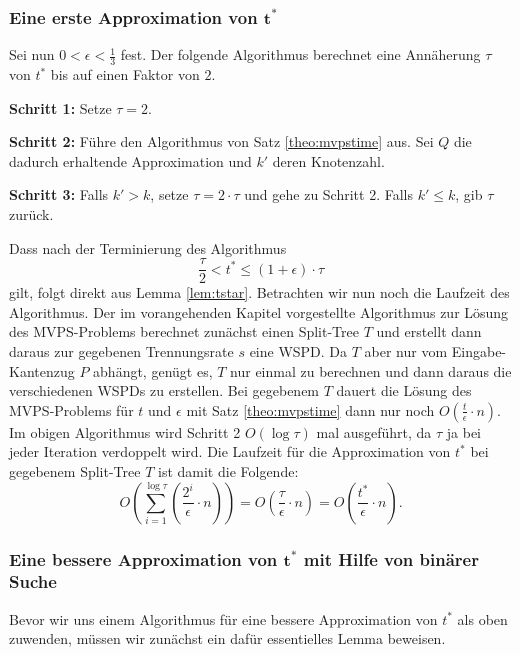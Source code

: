 \subsubsection*{Eine erste Approximation von $\mathbf{t^*}$}

Sei nun $0 < \epsilon < \frac{1}{3}$ fest.
Der folgende Algorithmus berechnet eine Annäherung $\tau$ von $t^*$ bis auf einen Faktor von $2$.
\begin{description}
	\item{\textbf{Schritt 1:}} Setze $\tau = 2$.
	\item{\textbf{Schritt 2:}} Führe den Algorithmus von Satz \ref{theo:mvpstime} aus. Sei $Q$ die dadurch erhaltende Approximation und $k'$ deren Knotenzahl.
	\item{\textbf{Schritt 3:}} Falls $k' > k$, setze $\tau = 2 \cdot \tau$ und gehe zu Schritt 2.
	Falls $k' \leq k$, gib $\tau$ zurück.
\end{description}

Dass nach der Terminierung des Algorithmus 
\[
	\label{eq:tau}
	\frac{\tau}{2} < t^* \leq (1 + \epsilon) \cdot \tau \tag{$\ast$}
\]
gilt, folgt direkt aus Lemma \ref{lem:tstar}. 
Betrachten wir nun noch die Laufzeit des Algorithmus. 
Der im vorangehenden Kapitel vorgestellte Algorithmus zur Lösung des MVPS-Problems berechnet zunächst einen Split-Tree $T$ und erstellt dann daraus zur gegebenen Trennungsrate $s$ eine WSPD. 
Da $T$ aber nur vom Eingabe-Kantenzug $P$ abhängt, genügt es, $T$ nur einmal zu berechnen und dann daraus die verschiedenen WSPDs zu erstellen.
Bei gegebenem $T$ dauert die Lösung des MVPS-Problems für $t$ und $\epsilon$ mit Satz \ref{theo:mvpstime} dann nur noch $O(\frac{t}{\epsilon}\cdot n)$.
Im obigen Algorithmus wird Schritt 2 $O(\log \tau)$ mal ausgeführt, da $\tau$ ja bei jeder Iteration verdoppelt wird.
Die Laufzeit für die Approximation von $t^*$ bei gegebenem Split-Tree $T$ ist damit die Folgende:
\[
O(\sum_{i=1}^{\log \tau} (\frac{2^i}{\epsilon}\cdot n))
= O(\frac{\tau}{\epsilon}\cdot n)
= O(\frac{t^*}{\epsilon}\cdot n).
\]

\subsubsection*{Eine bessere Approximation von $\mathbf{t^*}$ mit Hilfe von binärer Suche}
Bevor wir uns einem Algorithmus für eine bessere Approximation von $t^*$ als oben zuwenden, müssen wir zunächst ein dafür essentielles Lemma beweisen.

